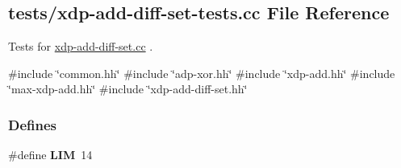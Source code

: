 \hypertarget{xdp-add-diff-set-tests_8cc}{\subsection{tests/xdp-\/add-\/diff-\/set-\/tests.cc \-File \-Reference}
\label{xdp-add-diff-set-tests_8cc}
}


\-Tests for \hyperlink{xdp-add-diff-set_8cc}{xdp-\/add-\/diff-\/set.\-cc} .  


{\ttfamily \#include \char`\"{}common.\-hh\char`\"{}}\*
{\ttfamily \#include \char`\"{}adp-\/xor.\-hh\char`\"{}}\*
{\ttfamily \#include \char`\"{}xdp-\/add.\-hh\char`\"{}}\*
{\ttfamily \#include \char`\"{}max-\/xdp-\/add.\-hh\char`\"{}}\*
{\ttfamily \#include \char`\"{}xdp-\/add-\/diff-\/set.\-hh\char`\"{}}\*
\subsubsection*{\-Defines}
\begin{DoxyCompactItemize}
\item 
\hypertarget{xdp-add-diff-set-tests_8cc_ac3ddfb9af20a2dc934b0540be75f1241}{\#define {\bfseries \-L\-I\-M}~14}\label{xdp-add-diff-set-tests_8cc_ac3ddfb9af20a2dc934b0540be75f1241}

\end{DoxyCompactItemize}
